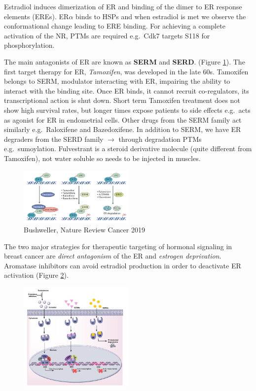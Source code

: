 Estradiol induces dimerization of ER and binding of the dimer to ER response elements (EREs). ER$\alpha$ binds to HSPs and when estradiol is met we observe the conformational change leading to ERE binding. For achieving a complete activation of the NR, PTMs are required e.g.~Cdk7 targets S118 for phosphorylation.

The main antagonists of ER are known as \textbf{SERM} and \textbf{SERD}. (Figure \ref{fig:serm}). The first target therapy for ER, \emph{Tamoxifen}, was developed in the late 60s. Tamoxifen belongs to SERM, modulator interacting with ER, impairing the ability to interact with the binding site. Once ER binds, it cannot recruit co-regulators, its transcriptional action is shut down. Short term Tamoxifen treatment does not show high survival rates, but longer times expose patients to side effects e.g.~acts as agonist for ER in endometrial cells. Other drugs from the SERM family act similarly e.g.~Raloxifene and Bazedoxifene. In addition to SERM, we have ER degraders from the SERD family $\rightarrow$ through degradation PTMs e.g.~sumoylation. Fulvestrant is a steroid derivative molecule (quite different from Tamoxifen), not water soluble so needs to be injected in muscles.

\begin{figure}
\centering
\includegraphics[width=0.5\textwidth]{../_resources/Screen_Shot_2022-11-18_at_11-06-54.png}
\caption{Bushweller, Nature Review Cancer 2019}
\label{fig:serm}
\end{figure}

The two major strategies for therapeutic targeting of hormonal signaling in breast cancer are \emph{direct antagonism} of the ER and \emph{estrogen deprivation}. Aromatase inhibitors can avoid estradiol production in order to deactivate ER activation (Figure \ref{fig:strategies}).

\begin{figure}
\centering
\includegraphics[width=0.5\textwidth]{../_resources/Screen_Shot_2022-11-18_at_11-14-09.png}
\caption{}
\label{fig:strategies}
\end{figure}



